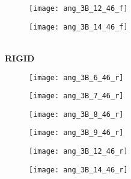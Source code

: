\documentclass[12pt]{article}
\begin{document}
\begin{figure}[h!]
  \begin{subfigure}[b]{0.15\textwidth}
    \texttt{[image: ang\_3B\_12\_46\_f]}
     \vspace{-15pt} \caption{}
    \label{fig:ang_12_f}
  \end{subfigure}
  \begin{subfigure}[b]{0.15\textwidth}
    \texttt{[image: ang\_3B\_14\_46\_f]}
    \vspace{-15pt} \caption{}
    \label{fig:ang_14_f}
  \end{subfigure} \\     \vspace{-10pt} 
 \textbf{RIGID} \\
  \begin{subfigure}[b]{0.15\textwidth}
    \texttt{[image: ang\_3B\_6\_46\_r]}
     \vspace{-15pt} \caption{}
    \label{fig:ang_6_r}
  \end{subfigure}
  \begin{subfigure}[b]{0.15\textwidth}
    \texttt{[image: ang\_3B\_7\_46\_r]}
     \vspace{-15pt} \caption{}
    \label{fig:ang_7_r}
  \end{subfigure}
  \begin{subfigure}[b]{0.15\textwidth}
    \texttt{[image: ang\_3B\_8\_46\_r]}
    \vspace{-15pt} \caption{}
    \label{fig:ang_8_r}
  \end{subfigure}
   \begin{subfigure}[b]{0.15\textwidth}
  \texttt{[image: ang\_3B\_9\_46\_r]}
    \vspace{-15pt} \caption{}
    \label{fig:ang_9_r}
  \end{subfigure}
  \begin{subfigure}[b]{0.15\textwidth}
    \texttt{[image: ang\_3B\_12\_46\_r]}
     \vspace{-15pt} \caption{}
    \label{fig:ang_12_r}
  \end{subfigure}
  \begin{subfigure}[b]{0.15\textwidth}
    \texttt{[image: ang\_3B\_14\_46\_r]}

\end{subfigure}
\end{figure}
\end{document}
